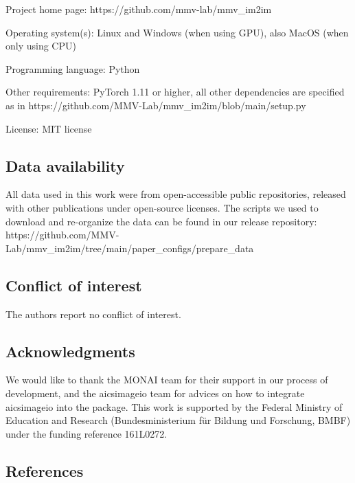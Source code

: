 Project home page: https://github.com/mmv-lab/mmv\_im2im

Operating system(s): Linux and Windows (when using GPU), also MacOS (when only using CPU)

Programming language: Python

Other requirements: PyTorch 1.11 or higher, all other dependencies are specified as in https://github.com/MMV-Lab/mmv\_im2im/blob/main/setup.py

License: MIT license

\hypertarget{data-availability}{%
\subsection{Data availability}\label{data-availability}}

All data used in this work were from open-accessible public repositories, released with other publications under open-source licenses. The scripts we used to download and re-organize the data can be found in our release repository: https://github.com/MMV-Lab/mmv\_im2im/tree/main/paper\_configs/prepare\_data

\hypertarget{conflict-of-interest}{%
\subsection{Conflict of interest}\label{conflict-of-interest}}

The authors report no conflict of interest.

\hypertarget{acknowledgments}{%
\subsection{Acknowledgments}\label{acknowledgments}}

We would like to thank the MONAI team for their support in our process of development, and the aicsimageio team for advices on how to integrate aicsimageio into the package. This work is supported by the Federal Ministry of Education and Research (Bundesministerium für Bildung und Forschung, BMBF) under the funding reference 161L0272.

\hypertarget{references}{%
\subsection{References}\label{references}}

